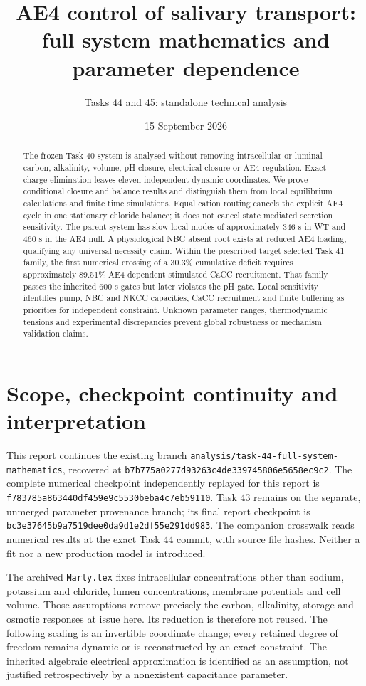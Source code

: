 \documentclass[11pt,a4paper]{article}
\title{AE4 control of salivary transport:\\full system mathematics and parameter dependence}
\author{Tasks 44 and 45: standalone technical analysis}
\date{15 September 2026}
\begin{document}
\maketitle
\begin{abstract}
The frozen Task 40 system is analysed without removing intracellular or
luminal carbon, alkalinity, volume, pH closure, electrical closure or AE4
regulation. Exact charge elimination leaves eleven independent dynamic
coordinates. We prove conditional closure and balance results and distinguish
them from local equilibrium calculations and finite time simulations. Equal
cation routing cancels the explicit AE4 cycle in one stationary chloride
balance; it does not cancel state mediated secretion sensitivity. The parent
system has slow local modes of approximately 346 s in WT and 460 s in the
AE4 null. A physiological NBC absent root exists at reduced AE4 loading,
qualifying any universal necessity claim. Within the prescribed target selected
Task 41 family, the first numerical crossing of a 30.3\% cumulative deficit
requires approximately 89.51\% AE4 dependent stimulated CaCC recruitment.
That family passes the inherited 600 s gates but later violates the pH gate.
Local sensitivity identifies pump, NBC and NKCC capacities, CaCC recruitment
and finite buffering as priorities for independent constraint. Unknown parameter
ranges, thermodynamic tensions and experimental discrepancies prevent global
robustness or mechanism validation claims.
\end{abstract}

\section{Scope, checkpoint continuity and interpretation}
This report continues the existing branch
\texttt{analysis/task-44-full-system-mathematics}, recovered at
\nolinkurl{b7b775a0277d93263c4de339745806e5658ec9c2}.
The complete numerical checkpoint independently replayed for this report is
\nolinkurl{f783785a863440df459e9c5530beba4c7eb59110}.
Task 43 remains on the separate, unmerged parameter provenance branch; its
final report checkpoint is
\nolinkurl{bc3e37645b9a7519dee0da9d1e2df55e291dd983}.
The companion crosswalk reads numerical results at the exact Task 44 commit,
with source file hashes. Neither a fit nor a new production model is introduced.

The archived \texttt{Marty.tex} fixes intracellular concentrations other than
sodium, potassium and chloride, lumen concentrations, membrane potentials
and cell volume. Those assumptions remove precisely the carbon, alkalinity,
storage and osmotic responses at issue here. Its reduction is therefore not
reused. The following scaling is an invertible coordinate change; every
retained degree of freedom remains dynamic or is reconstructed by an exact
constraint. The inherited algebraic electrical approximation is identified
as an assumption, not justified retrospectively by a nonexistent capacitance
parameter.
\end{document}
